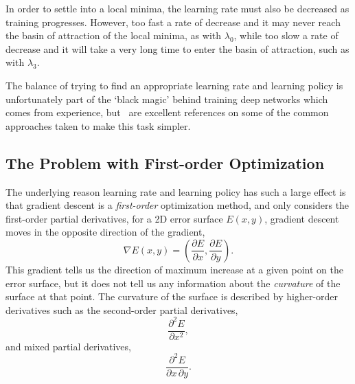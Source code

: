 \documentclass[thesis]{subfiles}
\begin{document}
In order to settle into a local minima, the learning rate must also be decreased as training progresses. However, too fast a rate of decrease and it may never reach the basin of attraction of the local minima, as with $\lambda_0$, while too slow a rate of decrease and it will take a very long time to enter the basin of attraction, such as with $\lambda_3$. 

The balance of trying to find an appropriate learning rate and learning policy is unfortunately part of the `black magic' behind training deep networks which comes from experience, but~\citep{Bottou2012sgdtricks, goodfellow2016deep} are excellent references on some of the common approaches taken to make this task simpler.

\subsection{The Problem with First-order Optimization}
The underlying reason learning rate and learning policy has such a large effect is that gradient descent is a \emph{first-order} optimization method, and only considers the first-order partial derivatives, \ie for a 2D error surface $E(x, y)$, gradient descent moves in the opposite direction of the gradient,
\begin{equation}
    \nabla E(x, y) = {\left(\frac{\partial E}{\partial x}, \frac{\partial E}{\partial y}\right)}.
\end{equation}
This gradient tells us the direction of maximum increase at a given point on the error surface, but it does not tell us any information about the \emph{curvature} of the surface at that point. The curvature of the surface is described by higher-order derivatives such as the second-order partial derivatives, \eg
\begin{equation}
    \frac{\partial^2 E}{\partial x^2},
\end{equation}
and mixed partial derivatives, \eg
\begin{equation}
    \frac{\partial^2 E}{\partial x\,\partial y}.
\end{equation}
\end{document}
